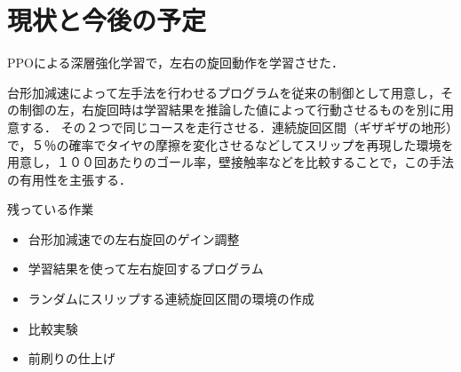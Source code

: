 \documentclass[a4paper,11pt]{jsarticle}
\begin{document}
\section{現状と今後の予定}
PPOによる深層強化学習で，左右の旋回動作を学習させた．\par
台形加減速によって左手法を行わせるプログラムを従来の制御として用意し，その制御の左，右旋回時は学習結果を推論した値によって行動させるものを別に用意する．
その２つで同じコースを走行させる．連続旋回区間（ギザギザの地形）で，５％の確率でタイヤの摩擦を変化させるなどしてスリップを再現した環境を用意し，１００回あたりのゴール率，壁接触率などを比較することで，この手法の有用性を主張する．\par
残っている作業
\begin{itemize}
  \item 台形加減速での左右旋回のゲイン調整
  \item 学習結果を使って左右旋回するプログラム
  \item ランダムにスリップする連続旋回区間の環境の作成
  \item 比較実験
  \item 前刷りの仕上げ
\end{itemize}
\end{document}
